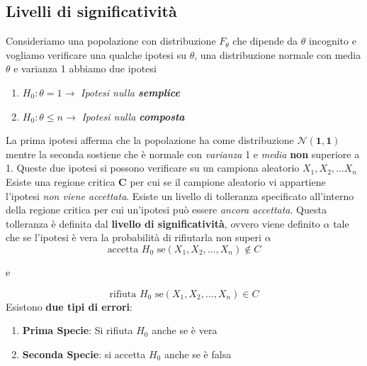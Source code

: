 \documentclass[]{article}
\begin{document}
    \subsection{Livelli di significatività}
    Consideriamo una popolazione con distribuzione $F_\theta$ che dipende da $\theta$ incognito e vogliamo verificare una qualche ipotesi su $\theta$, una distribuzione normale con media $\theta$ e varianza 1 abbiamo due ipotesi
    \begin{enumerate}
        \item $H_0 : \theta = 1 \rightarrow$ \textit{Ipotesi nulla \textbf{semplice}}
        \item $H_0 : \theta \leq n \rightarrow$ \textit{Ipotesi nulla \textbf{composta}}
    \end{enumerate}
    La prima ipotesi afferma che la popolazione ha come distribuzione $\boldsymbol{\mathcal{N}(1,1)}$ mentre la seconda sostiene che è normale con \textit{varianza} 1 e \textit{media} \textbf{non} superiore a 1. 
    Queste due ipotesi si possono verificare su un campiona aleatorio $X_1, X_2, \ldots X_n$ \\[2ex]
    Esiste una regione critica \textbf{C} per cui se il campione aleatorio vi appartiene l'ipotesi \textit{non viene accettata}. Esiste un livello di tolleranza specificato all'interno della regione critica per cui un'ipotesi può essere \textit{ancora accettata}.
    Questa tolleranza è definita dal \textbf{livello di significatività}, ovvero viene definito $\alpha$ tale che se l'ipotesi è vera la probabilità di rifiutarla non superi $\alpha$
    \[ \text{accetta } H_0 \text{ se} (X_1, X_2, \ldots, X_n) \not \in C \]
    \centerline{e}
    \[ \text{rifiuta } H_0 \text{ se} (X_1, X_2, \ldots, X_n) \in C \]
    Esistono \textbf{due tipi di errori}:
    \begin{enumerate}
        \item \textbf{Prima Specie}: Si rifiuta $H_0$ anche se è vera
        \item \textbf{Seconda Specie}: si accetta $H_0$ anche se è falsa
    \end{enumerate}
\end{document}
